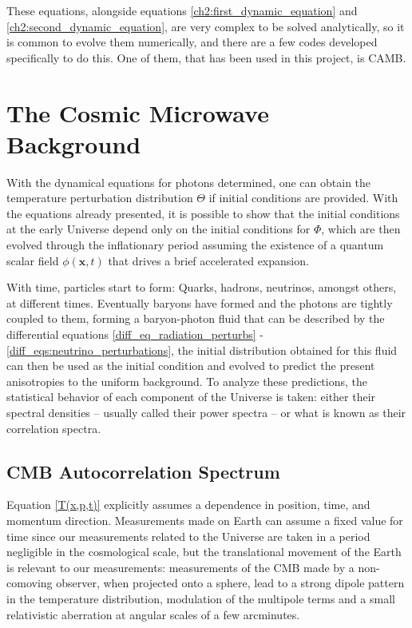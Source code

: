 \documentclass[openany,a4paper,12pt,oneside]{book}
\begin{document}
\begin{spacing}{1.5}
These equations, alongside equations \eqref{ch2:first_dynamic_equation} and \eqref{ch2:second_dynamic_equation}, are very complex to be solved analytically, so it is common to evolve them numerically, and there are a few codes developed specifically to do this. One of them, that has been used in this project, is CAMB.\cite{CAMB:Lewis1999bs, CAMB:Lewis2002ah}

\section{The Cosmic Microwave Background}

With the dynamical equations for photons determined, one can obtain the temperature perturbation distribution $\Theta$ if initial conditions are provided. With the equations already presented, it is possible to show that the initial conditions at the early Universe depend only on the initial conditions for $\Phi$\cite{dodelson2020modern}, which are then evolved through the inflationary period assuming the existence of a quantum scalar field $\phi(\mathbf{x}, t)$ that drives a brief accelerated expansion. 

With time, particles start to form: Quarks, hadrons, neutrinos, amongst others, at different times. Eventually baryons have formed and the photons are tightly coupled to them, forming a baryon-photon fluid that can be described by the differential equations \eqref{diff_eq_radiation_perturbs} - \eqref{diff_eqs:neutrino_perturbations}, the initial distribution obtained for this fluid can then be used as the initial condition and evolved to predict the present anisotropies to the uniform background. To analyze these predictions, the statistical behavior of each component of the Universe is taken: either their spectral densities -- usually called their power spectra -- or what is known as their correlation spectra. 

\subsection{CMB Autocorrelation Spectrum}

Equation \eqref{T(x,p,t)} explicitly assumes a dependence in position, time, and momentum direction. Measurements made on Earth can assume a fixed value for time since our measurements related to the Universe are taken in a period negligible in the cosmological scale, but the translational movement of the Earth is relevant to our measurements: measurements of the CMB made by a non-comoving observer, when projected onto a sphere, lead to a strong dipole pattern in the temperature distribution, modulation of the multipole terms and a small relativistic aberration at angular scales of a few arcminutes\cite{COBE_calibration, Planck_doppler, esteban_msc}.


\end{spacing}
\end{document}
